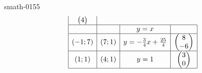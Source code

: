 \begin{corrige}{smath-0155}
\begin{equation*}
\begin{array}[]{|c|c|c|c|}
\begin{pmatrix}
                4    
            \end{pmatrix}\\
            \hline
            &&y=x&\\
            \hline
            (-1;7)&(7;1)&y=-\frac{ 3 }{ 4 }x+\frac{ 25 }{ 4 }&\begin{pmatrix}
                8    \\ 
                -6    
            \end{pmatrix}\\
            \hline
            (1;1)&(4;1)&y=1&\begin{pmatrix}
                3    \\ 
                0    
            \end{pmatrix}\\
            \hline
        \end{array}
    \end{equation*}

\end{corrige}
